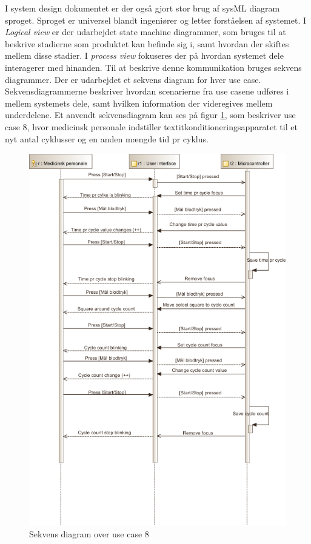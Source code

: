 	I system design dokumentet er der også gjort stor brug af sysML diagram sproget. Sproget er universel blandt ingeniører og letter forståelsen af systemet. I \textit{Logical view} er der udarbejdet state machine diagrammer, som bruges til at beskrive stadierne som produktet kan befinde sig i, samt hvordan der skiftes mellem disse stadier. I \textit{process view} fokuseres der på hvordan systemet dele interagerer med hinanden. Til at beskrive denne kommunikation bruges sekvens diagrammer. Der er udarbejdet et sekvens diagram for hver use case. Sekvensdiagrammerne beskriver hvordan scenarierne fra use casene udføres i mellem systemets dele, samt hvilken information der videregives mellem underdelene. Et anvendt sekvensdiagram kan ses på figur \ref{fig:sekvenseks}, som beskriver use case 8, hvor medicinsk personale indstiller textit{konditioneringsapparatet} til et nyt antal cyklusser og en anden mængde tid pr cyklus. 
	
	\begin{figure}[H]
		\centering
		\includegraphics[trim = {0 60 0 0}, clip, width = \textwidth]{billeder/SD-UC8.pdf}
		\caption{Sekvens diagram over use case 8}\label{fig:sekvenseks}
	\end{figure}
	
